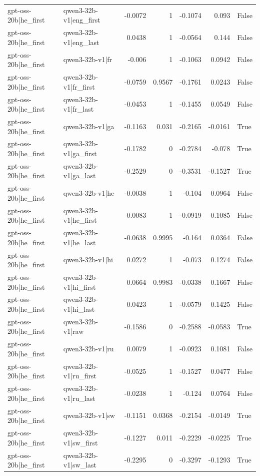 \begin{table}
\begin{tabular}{l l r r r r l}
gpt-oss-20b|he_first & qwen3-32b-v1|eng_first & -0.0072 & 1 & -0.1074 & 0.093 & False \\
gpt-oss-20b|he_first & qwen3-32b-v1|eng_last & 0.0438 & 1 & -0.0564 & 0.144 & False \\
gpt-oss-20b|he_first & qwen3-32b-v1|fr & -0.006 & 1 & -0.1063 & 0.0942 & False \\
gpt-oss-20b|he_first & qwen3-32b-v1|fr_first & -0.0759 & 0.9567 & -0.1761 & 0.0243 & False \\
gpt-oss-20b|he_first & qwen3-32b-v1|fr_last & -0.0453 & 1 & -0.1455 & 0.0549 & False \\
gpt-oss-20b|he_first & qwen3-32b-v1|ga & -0.1163 & 0.031 & -0.2165 & -0.0161 & True \\
gpt-oss-20b|he_first & qwen3-32b-v1|ga_first & -0.1782 & 0 & -0.2784 & -0.078 & True \\
gpt-oss-20b|he_first & qwen3-32b-v1|ga_last & -0.2529 & 0 & -0.3531 & -0.1527 & True \\
gpt-oss-20b|he_first & qwen3-32b-v1|he & -0.0038 & 1 & -0.104 & 0.0964 & False \\
gpt-oss-20b|he_first & qwen3-32b-v1|he_first & 0.0083 & 1 & -0.0919 & 0.1085 & False \\
gpt-oss-20b|he_first & qwen3-32b-v1|he_last & -0.0638 & 0.9995 & -0.164 & 0.0364 & False \\
gpt-oss-20b|he_first & qwen3-32b-v1|hi & 0.0272 & 1 & -0.073 & 0.1274 & False \\
gpt-oss-20b|he_first & qwen3-32b-v1|hi_first & 0.0664 & 0.9983 & -0.0338 & 0.1667 & False \\
gpt-oss-20b|he_first & qwen3-32b-v1|hi_last & 0.0423 & 1 & -0.0579 & 0.1425 & False \\
gpt-oss-20b|he_first & qwen3-32b-v1|raw & -0.1586 & 0 & -0.2588 & -0.0583 & True \\
gpt-oss-20b|he_first & qwen3-32b-v1|ru & 0.0079 & 1 & -0.0923 & 0.1081 & False \\
gpt-oss-20b|he_first & qwen3-32b-v1|ru_first & -0.0525 & 1 & -0.1527 & 0.0477 & False \\
gpt-oss-20b|he_first & qwen3-32b-v1|ru_last & -0.0238 & 1 & -0.124 & 0.0764 & False \\
gpt-oss-20b|he_first & qwen3-32b-v1|sw & -0.1151 & 0.0368 & -0.2154 & -0.0149 & True \\
gpt-oss-20b|he_first & qwen3-32b-v1|sw_first & -0.1227 & 0.011 & -0.2229 & -0.0225 & True \\
gpt-oss-20b|he_first & qwen3-32b-v1|sw_last & -0.2295 & 0 & -0.3297 & -0.1293 & True \\

\end{tabular}
\end{table}
